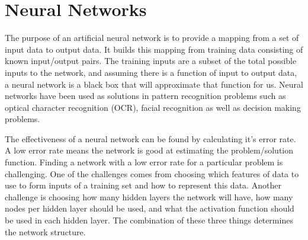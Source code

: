 \section{Neural Networks}
The purpose of an artificial neural network is to provide a mapping from a set of input data to output data. It builds this mapping from training data consisting of known input/output pairs. The training inputs are a subset of the total possible inputs to the network, and assuming there is a function of input to output data, a neural network is a black box that will approximate that function for us. Neural networks have been used as solutions in  pattern recognition problems such as optical character recognition (OCR), facial recognition as well as decision making problems.

The effectiveness of a neural network can be found by calculating it's error rate. A low error rate means the network is good at estimating the problem/solution function. Finding a network with a low error rate for a particular problem is challenging. One of the challenges comes from choosing which features of data to use to form inputs of a training set and how to represent this data. Another challenge is choosing how many hidden layers the network will have, how many nodes per hidden layer should be used, and what the activation function should be used in each hidden layer. The combination of these three things determines the network structure. 